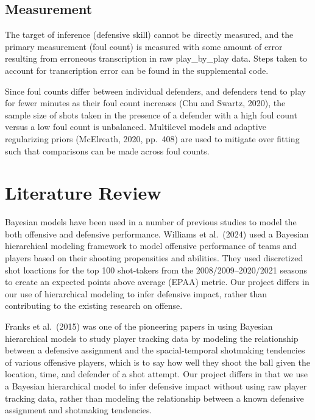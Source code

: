 \documentclass[
  letterpaper,
  DIV=11,
  numbers=noendperiod]{scrartcl}
\begin{document}
\subsection{Measurement}\label{measurement}

The target of inference (defensive skill) cannot be directly measured,
and the primary measurement (foul count) is measured with some amount of
error resulting from erroneous transcription in raw play\_by\_play data.
Steps taken to account for transcription error can be found in the
supplemental code.

Since foul counts differ between individual defenders, and defenders
tend to play for fewer minutes as their foul count increases (Chu and
Swartz, 2020), the sample size of shots taken in the presence of a
defender with a high foul count versus a low foul count is unbalanced.
Multilevel models and adaptive regularizing priors (McElreath, 2020,
pp.~408) are used to mitigate over fitting such that comparisons can be
made across foul counts.

\section{Literature Review}\label{literature-review}

Bayesian models have been used in a number of previous studies to model
the both offensive and defensive performance. Williams et al.~(2024)
used a Bayesian hierarchical modeling framework to model offensive
performance of teams and players based on their shooting propensities
and abilities. They used discretized shot loactions for the top 100
shot-takers from the 2008/2009--2020/2021 seasons to create an expected
points above average (EPAA) metric. Our project differs in our use of
hierarchical modeling to infer defensive impact, rather than
contributing to the existing research on offense.

Franks et al.~(2015) was one of the pioneering papers in using Bayesian
hierarchical models to study player tracking data by modeling the
relationship between a defensive assignment and the spacial-temporal
shotmaking tendencies of various offensive players, which is to say how
well they shoot the ball given the location, time, and defender of a
shot attempt. Our project differs in that we use a Bayesian hierarchical
model to infer defensive impact without using raw player tracking data,
rather than modeling the relationship between a known defensive
assignment and shotmaking tendencies.
\end{document}
